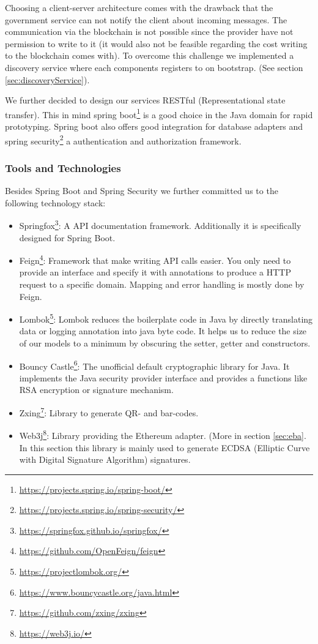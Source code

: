 Choosing a client-server architecture comes with the drawback that the government service can not notify the client about incoming messages. The communication via the blockchain is not possible since the provider have not permission to write to it (it would also not be feasible regarding the cost writing to the blockchain comes with). To overcome this challenge we implemented a discovery service where each components registers to on bootstrap. (See section \ref{sec:discoveryService}).

We further decided to design our services RESTful (Representational state transfer). This in mind spring boot\footnote{\url{https://projects.spring.io/spring-boot/}} is a good choice in the Java domain for rapid prototyping. Spring boot also offers good integration for database adapters and spring security\footnote{\url{https://projects.spring.io/spring-security/}} a authentication and authorization framework. 

\subsubsection{Tools and Technologies}
Besides Spring Boot and Spring Security we further committed us to the following technology stack:

\begin{itemize}
\item Springfox\footnote{\url{https://springfox.github.io/springfox/}}: A API documentation framework. Additionally it is specifically designed for Spring Boot.
\item Feign\footnote{\url{https://github.com/OpenFeign/feign}}: Framework that make writing API calls easier. You only need to provide an interface and specify it with annotations to produce a HTTP request to a specific domain. Mapping and error handling is mostly done by Feign. 
\item Lombok\footnote{\url{https://projectlombok.org/}}: Lombok reduces the boilerplate code in Java by directly translating data or logging annotation into java byte code. It helps us to reduce the size of our models to a minimum by obscuring the setter, getter and constructors. 
\item Bouncy Castle\footnote{\url{https://www.bouncycastle.org/java.html}}: The unofficial default cryptographic library for Java. It implements the Java security provider interface and provides a functions like RSA encryption or signature mechanism.
\item Zxing\footnote{\url{https://github.com/zxing/zxing}}: Library to generate QR- and bar-codes. 
\item Web3j\footnote{\url{https://web3j.io/}}: Library providing the Ethereum adapter. (More in section \ref{sec:eba}. In this section this library is mainly used to generate ECDSA (Elliptic Curve with Digital Signature Algorithm) signatures. 
\end{itemize}

